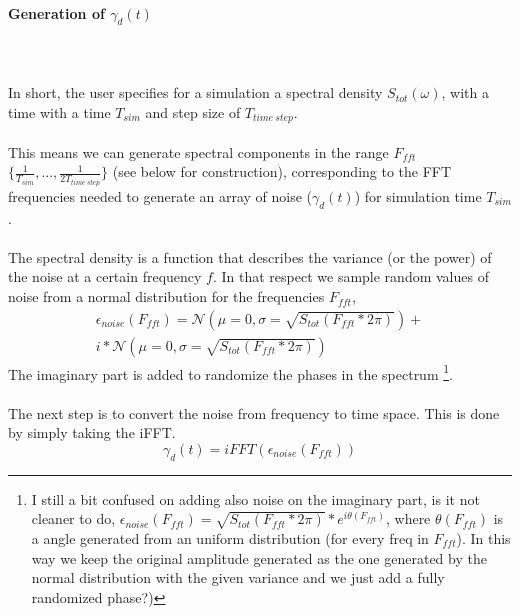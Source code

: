 \documentclass{paper}
\begin{document}
\paragraph{Generation of $\gamma_d(t)$} \mbox{}%
\label{par:generation_of_}
\\ \\
In short, the user specifies for a simulation a spectral density $S_{tot}(\omega)$, with a time with a time $T_{sim}$ and step size of $T_{time\:step}$.
\\ \\
This means we can generate spectral components in the range $F_{fft}$ $\{\frac{1}{T_{sim}}, ... , \frac{1}{2T_{time\:step}}\}$ (see below for construction), corresponding to the FFT frequencies needed to generate an array of noise ($\gamma_d(t)$) for simulation time $T_{sim}$.
\\ \\
The spectral density is a function that describes the variance (or the power) of the noise at a certain frequency $f$. In that respect we sample random values of noise from a normal distribution for the frequencies $F_{fft}$,
\begin{equation}
\begin{split}
	\epsilon_{noise}(F_{fft}) = \mathcal{N}(\mu = 0, \sigma = \sqrt{S_{tot}(F_{fft}*2\pi)}) +\\ i * \mathcal{N}(\mu = 0, \sigma = \sqrt{S_{tot}(F_{fft}*2\pi)})
\end{split}
\end{equation}
The imaginary part is added to randomize the phases in the spectrum \footnote{\color{blue} I still a bit confused on adding also noise on the imaginary part, is it not cleaner to do, $\epsilon_{noise}(F_{fft}) = \sqrt{S_{tot}(F_{fft}*2\pi)}*e^{i\theta(F_{fft})}$, where $\theta(F_{fft})$ is a angle generated from an uniform distribution (for every freq in $F_{fft}$). In this way we keep the original amplitude generated as the one generated by the normal distribution with the given variance and we just add a fully randomized phase?)}.
\\ \\
The next step is to convert the noise from frequency to time space. This is done by simply taking the iFFT.
\begin{equation}
	\gamma_d(t) = iFFT(\epsilon_{noise}(F_{fft}))
\end{equation}
\end{document}
